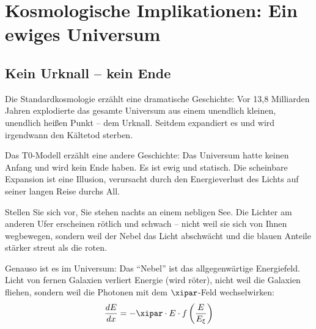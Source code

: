 	\begin{table}[H]
		\centering
		\caption{Energieskalen-Hierarchie im T0-Modell}
	\end{table}
	
	\section{Kosmologische Implikationen: Ein ewiges Universum}
	
	\subsection{Kein Urknall -- kein Ende}
	
	Die Standardkosmologie erzählt eine dramatische Geschichte: Vor 13,8 Milliarden Jahren explodierte das gesamte Universum aus einem unendlich kleinen, unendlich heißen Punkt -- dem Urknall. Seitdem expandiert es und wird irgendwann den Kältetod sterben.
	
	Das T0-Modell erzählt eine andere Geschichte: Das Universum hatte keinen Anfang und wird kein Ende haben. Es ist ewig und statisch. Die scheinbare Expansion ist eine Illusion, verursacht durch den Energieverlust des Lichts auf seiner langen Reise durchs All.
	
	\begin{revolutionary}
		Stellen Sie sich vor, Sie stehen nachts an einem nebligen See. Die Lichter am anderen Ufer erscheinen rötlich und schwach -- nicht weil sie sich von Ihnen wegbewegen, sondern weil der Nebel das Licht abschwächt und die blauen Anteile stärker streut als die roten. 
		
		Genauso ist es im Universum: Das ``Nebel'' ist das allgegenwärtige Energiefeld. Licht von fernen Galaxien verliert Energie (wird röter), nicht weil die Galaxien fliehen, sondern weil die Photonen mit dem $\xipar$-Feld wechselwirken:
		\begin{equation}
			\frac{dE}{dx} = -\xipar \cdot E \cdot f\left(\frac{E}{E_\xi}\right)
		\end{equation}
	\end{revolutionary}
	
